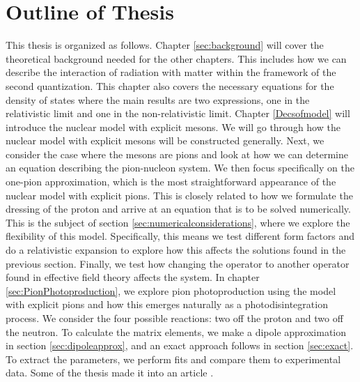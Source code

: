 \section{Outline of Thesis}
This thesis is organized as follows. Chapter \ref{sec:background} will cover the theoretical background needed for the other chapters. This includes how we can describe the interaction of radiation with matter within the framework of the second quantization. This chapter also covers the necessary equations for the density of states where the main results are two expressions, one in the relativistic limit and one in the non-relativistic limit. Chapter \ref{Decsofmodel} will introduce the nuclear model with explicit mesons. We will go through how the nuclear model with explicit mesons will be constructed generally. Next, we consider the case where the mesons are pions and look at how we can determine an equation describing the pion-nucleon system. We then focus specifically on the one-pion approximation, which is the most straightforward appearance of the nuclear model with explicit pions. This is closely related to how we formulate the dressing of the proton and arrive at an equation that is to be solved numerically. This is the subject of section \ref{sec:numericalconsiderations}, where we explore the flexibility of this model. Specifically, this means we test different form factors and do a relativistic expansion to explore how this affects the solutions found in the previous section. Finally, we test how changing the operator to another operator found in effective field theory affects the system. In chapter \ref{sec:PionPhotoproduction}, we explore pion photoproduction using the model with explicit pions and how this emerges naturally as a photodisintegration process. We consider the four possible reactions: two off the proton and two off the neutron. To calculate the matrix elements, we make a dipole approximation in section \ref{sec:dipoleapprox}, and an exact approach follows in section \ref{sec:exact}. To extract the parameters, we perform fits and compare them to experimental data. Some of the thesis made it into an article \cite{ThresholdPion}.
